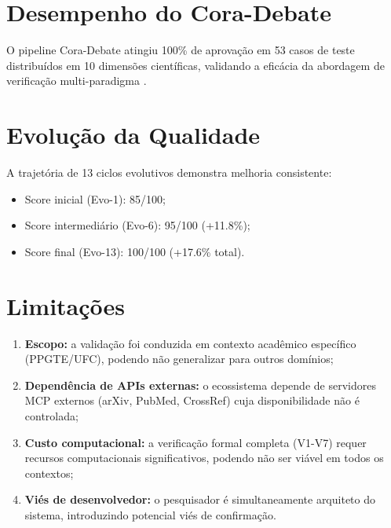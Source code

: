 \documentclass[12pt,a4paper,sumario=tradicional]{abntex2}
\begin{document}
\section{Desempenho do Cora-Debate}

O pipeline Cora-Debate atingiu 100\% de aprovação em 53 casos de teste distribuídos em 10 dimensões científicas, validando a eficácia da abordagem de verificação multi-paradigma \cite{antero2024harnessing, xu2026optimisation}.

\section{Evolução da Qualidade}

A trajetória de 13 ciclos evolutivos demonstra melhoria consistente:

\begin{itemize}
    \item Score inicial (Evo-1): 85/100;
    \item Score intermediário (Evo-6): 95/100 (+11.8\%);
    \item Score final (Evo-13): 100/100 (+17.6\% total).
\end{itemize}

\section{Limitações}

\begin{enumerate}
    \item \textbf{Escopo:} a validação foi conduzida em contexto acadêmico específico (PPGTE/UFC), podendo não generalizar para outros domínios;
    \item \textbf{Dependência de APIs externas:} o ecossistema depende de servidores MCP externos (arXiv, PubMed, CrossRef) cuja disponibilidade não é controlada;
    \item \textbf{Custo computacional:} a verificação formal completa (V1-V7) requer recursos computacionais significativos, podendo não ser viável em todos os contextos;
    \item \textbf{Viés de desenvolvedor:} o pesquisador é simultaneamente arquiteto do sistema, introduzindo potencial viés de confirmação.
\end{enumerate}

\end{document}
